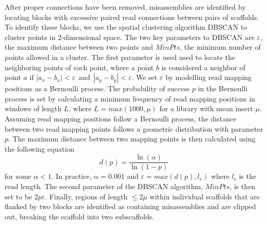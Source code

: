 \documentclass{bioinfo}
\begin{document}
After proper connections have been removed, misassemblies are identified by locating blocks with excessive 
paired read connections between pairs of scaffolds. To identify these blocks, we use the spatial clustering algorithm DBSCAN 
to cluster points in 2-dimensional space. The two key parameters to DBSCAN are $\varepsilon$, the maximum distance between 
two points and $MinPts$, the minimum number of points allowed in a cluster. The first parameter is used used to locate 
the neighboring points of each point, where a point $b$ is considered a neighbor of point $a$ if $|a_x - b_x| < \varepsilon 
~~\mbox{and}~~ |a_y - b_y| < \varepsilon$. We set $\varepsilon$ by modelling read mapping positions as a Bernoulli process. 
The probability of success $p$ in the Bernoulli process is set by calculating a minimum frequency of read mapping positions
in windows of length $L$, where $L = max(1000,\mu)$ for a library with mean insert $\mu$. Assuming read mapping positions 
follow a Bernoulli process, the distance between two read mapping points follows a geometric distribution with parameter $p$.
The maximum distance between two mapping points is then calculated using the following equation
\begin{equation}
	d(p) = \dfrac{\ln(\alpha)}{\ln(1-p)}
\end{equation} 
for some $\alpha < 1$. In practice, $\alpha = 0.001$ and $\varepsilon = max(d(p),l_r)$ where $l_r$ is the read length.
The second parameter of the DBSCAN algorithm, $MinPts$, is then set to be $2p\varepsilon$.
Finally, regions of length $\le 2\mu$ within individual scaffolds that are flanked by two blocks are identified as containing
misassemblies and are clipped out, breaking the scaffold into two subscaffolds.
\end{document}
